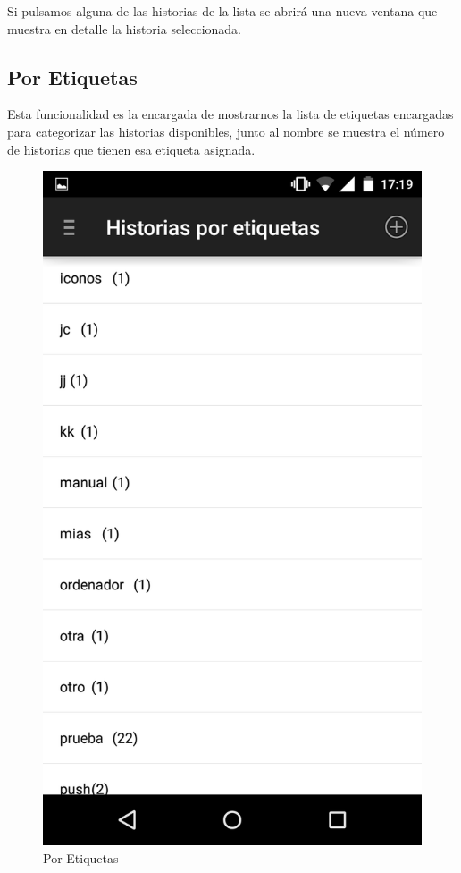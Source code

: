 \documentclass[11pt,a4paper, titlepage]{article}
\begin{document}
	Si pulsamos alguna de las historias de la lista se abrirá una nueva ventana que muestra en detalle la historia seleccionada.
	
	\FloatBarrier
	\subsection[Por Etiquetas]{Por Etiquetas}
	
	Esta funcionalidad es la encargada de mostrarnos la lista de etiquetas encargadas para categorizar las historias disponibles, junto al nombre se muestra el número de historias que tienen esa etiqueta asignada.
	
	\begin{figure}[hbtp]
		\centering
		\includegraphics[scale = 0.25 ]{img/6}
		\caption{Por Etiquetas}
		\label{p13}
	\end{figure}
	
\end{document}
